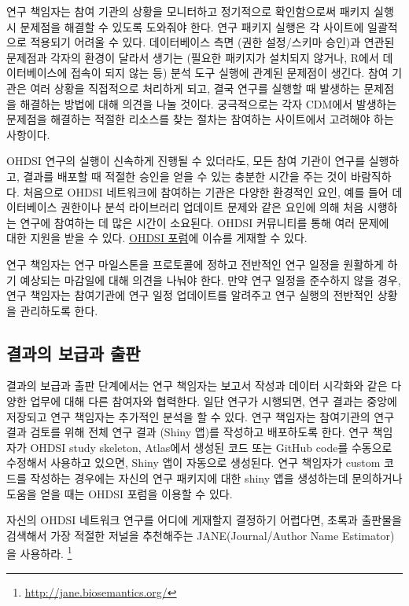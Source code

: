 \documentclass[10.5pt]{book}
\let\rmarkdownfootnote\footnote%
\def\footnote{\protect\rmarkdownfootnote}
\theoremstyle{definition}
\theoremstyle{definition}
\theoremstyle{definition}
\theoremstyle{remark}
\let\BeginKnitrBlock\begin \let\EndKnitrBlock\end
\begin{document}
연구 책임자는 참여 기관의 상황을 모니터하고 정기적으로 확인함으로써
패키지 실행 시 문제점을 해결할 수 있도록 도와줘야 한다. 연구 패키지
실행은 각 사이트에 일괄적으로 적용되기 어려울 수 있다. 데이터베이스 측면
(권한 설정/스키마 승인)과 연관된 문제점과 각자의 환경이 달라서 생기는
(필요한 패키지가 설치되지 않거나, R에서 데이터베이스에 접속이 되지 않는
등) 분석 도구 실행에 관계된 문제점이 생긴다. 참여 기관은 여러 상황을
직접적으로 처리하게 되고, 결국 연구를 실행할 때 발생하는 문제점을
해결하는 방법에 대해 의견을 나눌 것이다. 궁극적으로는 각자 CDM에서
발생하는 문제점을 해결하는 적절한 리소스를 찾는 절차는 참여하는
사이트에서 고려해야 하는 사항이다.

OHDSI 연구의 실행이 신속하게 진행될 수 있더라도, 모든 참여 기관이 연구를
실행하고, 결과를 배포할 때 적절한 승인을 얻을 수 있는 충분한 시간을 주는
것이 바람직하다. 처음으로 OHDSI 네트워크에 참여하는 기관은 다양한
환경적인 요인, 예를 들어 데이터베이스 권한이나 분석 라이브러리 업데이트
문제와 같은 요인에 의해 처음 시행하는 연구에 참여하는 데 많은 시간이
소요된다. OHDSI 커뮤니티를 통해 여러 문제에 대한 지원을 받을 수 있다.
\href{http://forums.ohdsi.org}{OHDSI 포럼}에 이슈를 게재할 수 있다.

연구 책임자는 연구 마일스톤을 프로토콜에 정하고 전반적인 연구 일정을
원활하게 하기 예상되는 마감일에 대해 의견을 나눠야 한다. 만약 연구
일정을 준수하지 않을 경우, 연구 책임자는 참여기관에 연구 일정 업데이트를
알려주고 연구 실행의 전반적인 상황을 관리하도록 한다.

\subsection{결과의 보급과 출판}\label{--}

결과의 보급과 출판 단계에서는 연구 책임자는 보고서 작성과 데이터
시각화와 같은 다양한 업무에 대해 다른 참여자와 협력한다. 일단 연구가
시행되면, 연구 결과는 중앙에 저장되고 연구 책임자는 추가적인 분석을 할
수 있다. 연구 책임자는 참여기관의 연구 결과 검토를 위해 전체 연구 결과
(Shiny 앱)를 작성하고 배포하도록 한다. 연구 책임자가 OHDSI study
skeleton, Atlas에서 생성된 코드 또는 GitHub code를 수동으로 수정해서
사용하고 있으면, Shiny 앱이 자동으로 생성된다. 연구 책임자가 custom
코드를 작성하는 경우에는 자신의 연구 패키지에 대한 shiny 앱을 생성하는데
문의하거나 도움을 얻을 때는 OHDSI 포럼을 이용할 수 있다.

\BeginKnitrBlock{rmdimportant}
자신의 OHDSI 네트워크 연구를 어디에 게재할지 결정하기 어렵다면, 초록과
출판물을 검색해서 가장 적절한 저널을 추천해주는 JANE(Journal/Author Name
Estimator)을 사용하라. \footnote{\url{http://jane.biosemantics.org/}}
\EndKnitrBlock{rmdimportant}
\end{document}
